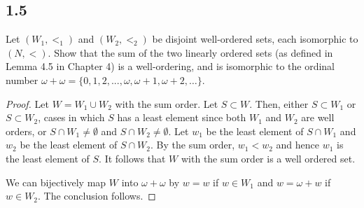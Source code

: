 \subsection*{1.5} Let $(W_1, <_1)$ and $(W_2, <_2)$ be disjoint well-ordered sets, each isomorphic to $(N, <)$. Show that the sum of the two linearly ordered sets (as defined in Lemma 4.5 in Chapter 4) is a well-ordering, and is isomorphic to the ordinal number $\omega + \omega=  \{0, 1, 2, ... ,\omega,\omega + 1,\omega + 2, \dots \}$.

\begin{proof}
    Let $W = W_1 \cup W_2$ with the sum order. Let $S \subset W$. Then, either $S \subset W_1$ or $S \subset W_2$, cases in which $S$ has a least element since both $W_1$ and $W_2$ are well orders, or $S \cap W_1 \neq \emptyset$ and $S \cap W_2 \neq \emptyset$. Let $w_1$ be the least element of $S \cap W_1$ and $w_2$ be the least element of $S \cap W_2$. By the sum order, $w_1 < w_2$ and hence $w_1$ is the least element of $S$. It follows that $W$ with the sum order is a well ordered set.

    We can bijectively map $W$ into $\omega + \omega$ by $w = w$ if $w \in W_1$ and $w = \omega + w$ if $w \in W_2$. The conclusion follows.
\end{proof}


